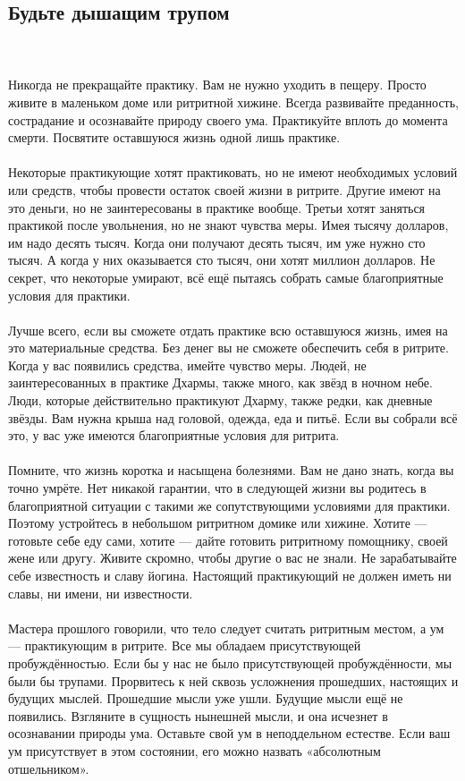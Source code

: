 \subsection{Будьте дышащим трупом}
\\ \\ Никогда не прекращайте практику. Вам не нужно уходить в пещеру. Просто живите в маленьком доме или ритритной хижине. Всегда развивайте преданность, сострадание и осознавайте природу своего ума. Практикуйте вплоть до момента смерти. Посвятите оставшуюся жизнь одной лишь практике.
\\ \\ Некоторые практикующие хотят практиковать, но не имеют необходимых условий или средств, чтобы провести остаток своей жизни в ритрите. Другие имеют на это деньги, но не заинтересованы в практике вообще. Третьи хотят заняться практикой после увольнения, но не знают чувства меры. Имея тысячу долларов, им надо десять тысяч. Когда они получают десять тысяч, им уже нужно сто тысяч. А когда у них оказывается сто тысяч, они хотят миллион долларов. Не секрет, что некоторые умирают, всё ещё пытаясь собрать самые благоприятные условия для практики. 
\\ \\ Лучше всего, если вы сможете отдать практике всю оставшуюся жизнь, имея на это материальные средства. Без денег вы не сможете обеспечить себя в ритрите. Когда у вас появились средства, имейте чувство меры. Людей, не заинтересованных в практике Дхармы, также много, как звёзд в ночном небе. Люди, которые действительно практикуют Дхарму, также редки, как дневные звёзды. Вам нужна крыша над головой, одежда, еда и питьё. Если вы собрали всё это, у вас уже имеются благоприятные условия для ритрита.
\\ \\ Помните, что жизнь коротка и насыщена болезнями. Вам не дано знать, когда вы точно умрёте. Нет никакой гарантии, что в следующей жизни вы родитесь в благоприятной ситуации с такими же сопутствующими условиями для практики. Поэтому устройтесь в небольшом ритритном домике или хижине. Хотите — готовьте себе еду сами, хотите — дайте готовить ритритному помощнику, своей жене или другу. Живите скромно, чтобы другие о вас не знали. Не зарабатывайте себе известность и славу йогина. Настоящий практикующий не должен иметь ни славы, ни имени, ни известности.
\\ \\ Мастера прошлого говорили, что тело следует считать ритритным местом, а ум — практикующим в ритрите. Все мы обладаем присутствующей пробуждённостью. Если бы у нас не было присутствующей пробуждённости, мы были бы трупами. Прорвитесь к ней сквозь усложнения прошедших, настоящих и будущих мыслей. Прошедшие мысли уже ушли. Будущие мысли ещё не появились. Взгляните в сущность нынешней мысли, и она исчезнет в осознавании природы ума. Оставьте свой ум в неподдельном естестве. Если ваш ум присутствует в этом состоянии, его можно назвать «абсолютным отшельником».
